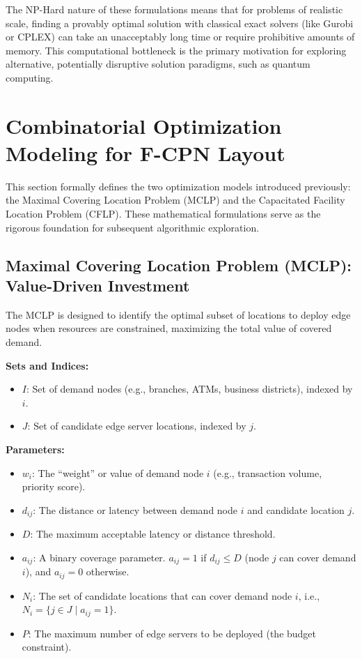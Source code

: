 \documentclass[11pt,a4paper]{article}
\begin{document}
The NP-Hard nature of these formulations means that for problems of realistic scale, finding a provably optimal solution with classical exact solvers (like Gurobi or CPLEX) can take an unacceptably long time or require prohibitive amounts of memory. This computational bottleneck is the primary motivation for exploring alternative, potentially disruptive solution paradigms, such as quantum computing.

\section{Combinatorial Optimization Modeling for F-CPN Layout}

This section formally defines the two optimization models introduced previously: the Maximal Covering Location Problem (MCLP) and the Capacitated Facility Location Problem (CFLP). These mathematical formulations serve as the rigorous foundation for subsequent algorithmic exploration.

\subsection{Maximal Covering Location Problem (MCLP): Value-Driven Investment}

The MCLP is designed to identify the optimal subset of locations to deploy edge nodes when resources are constrained, maximizing the total value of covered demand.

\textbf{Sets and Indices:}
\begin{itemize}
    \item $I$: Set of demand nodes (e.g., branches, ATMs, business districts), indexed by $i$.
    \item $J$: Set of candidate edge server locations, indexed by $j$.
\end{itemize}

\textbf{Parameters:}
\begin{itemize}
    \item $w_i$: The ``weight'' or value of demand node $i$ (e.g., transaction volume, priority score).
    \item $d_{ij}$: The distance or latency between demand node $i$ and candidate location $j$.
    \item $D$: The maximum acceptable latency or distance threshold.
    \item $a_{ij}$: A binary coverage parameter. $a_{ij} = 1$ if $d_{ij} \leq D$ (node $j$ can cover demand $i$), and $a_{ij} = 0$ otherwise.
    \item $N_i$: The set of candidate locations that can cover demand node $i$, i.e., $N_i = \{j \in J \mid a_{ij} = 1\}$.
    \item $P$: The maximum number of edge servers to be deployed (the budget constraint).
\end{itemize}
\end{document}
